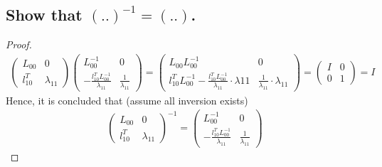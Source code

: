 \documentclass[11pt,a4paper]{article}
\begin{document}
\newpage
\section{}
\subsection{Show that $(..)^{-1} = (..)$.}
\begin{proof}
\begin{align}
    \left( \begin{array}{c|c} 
        L_{00} & 0 \\ \hline
        l_{10}^T & \lambda_{11}
    \end{array} \right)
    \left( \begin{array}{c|c} 
        L_{00}^{-1} & 0 \\ \hline
        -\frac{l_{10}^T L_{00}^{-1}}{\lambda_{11}} & \frac{1}{\lambda_{11}}
    \end{array} \right)
    = 
    \left( \begin{array}{c|c} 
        L_{00} L_{00}^{-1}  & 0 \\ \hline
        l_{10}^T L_{00}^{-1}-\frac{l_{10}^T L_{00}^{-1}}{\lambda_{11}}\cdot \lambda{11} 
        & \frac{1}{\lambda_{11}} \cdot \lambda_{11}
    \end{array} \right)
    =\left( \begin{array}{c|c} 
        I & 0 \\ \hline
        0 & 1
    \end{array} \right)
    = I
\end{align}
Hence, it is concluded that (assume all inversion exists)
\begin{align}
\left( \begin{array}{c|c} 
        L_{00} & 0 \\ \hline
        l_{10}^T & \lambda_{11}
    \end{array} \right)^{-1}
= \left( \begin{array}{c|c} 
        L_{00}^{-1} & 0 \\ \hline
        -\frac{l_{10}^T L_{00}^{-1}}{\lambda_{11}} & \frac{1}{\lambda_{11}}
    \end{array} \right)
\end{align}
\end{proof}
\end{document}

